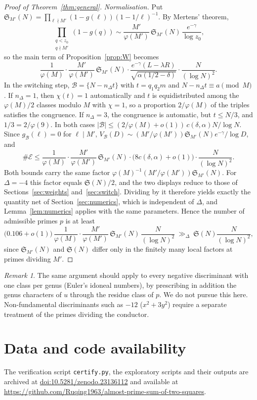 \documentclass[11pt]{amsart}
\theoremstyle{remark}
\newtheorem{remark}[theorem]{Remark}
\newcommand{\cB}{\mathcal{B}}
\newcommand{\cE}{\mathcal{E}}
\newcommand{\Sg}{\mathfrak{S}}
\begin{document}
\begin{proof}[Proof of Theorem~\ref{thm:general}]
\emph{Normalisation.} Put $\Sg_{M'}(N)=\prod_{\ell\nmid M'}(1-g(\ell))(1-1/\ell)^{-1}$. By Mertens'
theorem,
\[
\prod_{\substack{q<z_0\\ q\nmid M'}}(1-g(q))\sim\frac{M'}{\varphi(M')}\,\Sg_{M'}(N)\,\frac{e^{-\gamma}}{\log z_0},
\]
so the main term of Proposition~\ref{prop:W} becomes
\[
\frac{1}{\varphi(M)}\cdot\frac{M'}{\varphi(M')}\,\Sg_{M'}(N)\cdot
\frac{e^{-\gamma}(L-\lambda R)}{\sqrt{\alpha(1/2-\delta)}}\cdot\frac{N}{(\log N)^2}.
\]
In the switching step, $\cB=\{N-n_\Delta t\}$ with $t=q_1q_2m$ and $N-n_\Delta t\equiv a\pmod M$. If
$n_\Delta=1$, then $\chi(t)=1$ automatically and $t$ is equidistributed among the $\varphi(M)/2$ classes
modulo $M$ with $\chi=1$, so a proportion $2/\varphi(M)$ of the triples satisfies the congruence. If
$n_\Delta=3$, the congruence is automatic, but $t\le N/3$, and $1/3=2/\varphi(9)$. In both cases
$|\cB|\le(2/\varphi(M)+o(1))\,c(\delta,\alpha)N/\log N$. Since $g_\cB(\ell)=0$ for $\ell\mid M'$,
$V_\cB(D)\sim(M'/\varphi(M'))\Sg_{M'}(N)e^{-\gamma}/\log D$, and
\[
\#\cE\le\frac{1}{\varphi(M)}\cdot\frac{M'}{\varphi(M')}\,\Sg_{M'}(N)\cdot\bigl(8c(\delta,\alpha)+o(1)\bigr)
\cdot\frac{N}{(\log N)^2}.
\]
Both bounds carry the same factor $\varphi(M)^{-1}(M'/\varphi(M'))\Sg_{M'}(N)$. For $\Delta=-4$ this
factor equals $\Sg(N)/2$, and the two displays reduce to those of Sections~\ref{sec:weights}
and~\ref{sec:switch}. Dividing by it therefore yields exactly the quantity $\mathrm{net}$ of
Section~\ref{sec:numerics}, which is independent of $\Delta$, and Lemma~\ref{lem:numerics} applies with
the same parameters. Hence the number of admissible primes $p$ is at least
\[
\bigl(0.106+o(1)\bigr)\,\frac{1}{\varphi(M)}\cdot\frac{M'}{\varphi(M')}\,\Sg_{M'}(N)\,\frac{N}{(\log N)^2}
\ \gg_\Delta\ \Sg(N)\frac{N}{(\log N)^2},
\]
since $\Sg_{M'}(N)$ and $\Sg(N)$ differ only in the finitely many local factors at primes dividing
$M'$.
\end{proof}

\begin{remark}
The same argument should apply to every negative discriminant with one class per genus (Euler's idoneal
numbers), by prescribing in addition the genus characters of $u$ through the residue class of $p$. We do
not pursue this here. Non-fundamental discriminants such as $-12$ ($x^2+3y^2$) require a separate
treatment of the primes dividing the conductor.
\end{remark}

\section*{Data and code availability}
The verification script \texttt{certify.py}, the exploratory scripts and their outputs are archived at
\href{https://doi.org/10.5281/zenodo.23136112}{doi:10.5281/zenodo.23136112} and available at\\
\url{https://github.com/Ruqing1963/almost-prime-sum-of-two-squares}.
\end{document}
